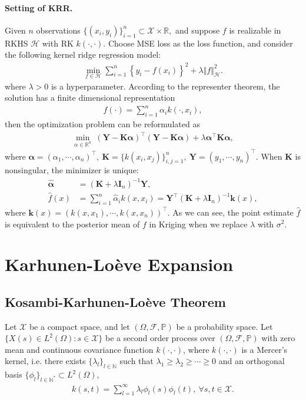 \documentclass{article}
\begin{document}
\paragraph{Setting of KRR.} Given $n$ observations $\lbrace(x_i,y_i)\rbrace_{i=1}^n\subset\mathcal{X}\times\mathbb{R},$ and suppose $f$ is realizable in RKHS $\mathcal{H}$ with RK $k(\cdot,\cdot).$ Choose MSE loss as the loss function, and consider the following kernel ridge regression model:
\begin{align*}
	\min_{f\in\mathcal{H}} \sum_{i=1}^n \left\lbrace y_i - f(x_i)\right\rbrace^2 + \lambda\Vert f\Vert_\mathcal{H}^2.\tag{6.16}
\end{align*}
where $\lambda>0$ is a hyperparameter. According to the representer theorem, the solution has a finite dimensional representation 
\begin{align*}
	f(\cdot) = \sum_{i=1}^n \alpha_i k(\cdot,x_i),\tag{6.17}
\end{align*}
then the optimization problem can be reformulated as
\begin{align*}
	\min_{\alpha\in\mathbb{R}^n}\ (\mathbf{Y} - \mathbf{K}\pmb{\alpha})^\top(\mathbf{Y} - \mathbf{K}\pmb{\alpha}) + \lambda\pmb{\alpha}^\top\mathbf{K}\pmb{\alpha},\tag{6.18}
\end{align*}
where $\pmb{\alpha}=(\alpha_1,\cdots,\alpha_n)^\top,\ \mathbf{K}=\lbrace k(x_i,x_j)\rbrace_{i,j=1}^n,\ \mathbf{Y}=(y_1,\cdots,y_n)^\top.$ When $\mathbf{K}$ is nonsingular, the minimizer is unique:
\begin{align*}
	\hat{\pmb{\alpha}} &= (\mathbf{K}+\lambda\mathbf{I}_n)^{-1}\mathbf{Y},\tag{6.19}\\
	\hat{f}(x) &= \sum_{i=1}^n\hat{\alpha}_ik(x,x_i) = \mathbf{Y}^\top(\mathbf{K}+\lambda\mathbf{I}_n)^{-1}\mathbf{k}(x),\tag{6.20}
\end{align*}
where $\mathbf{k}(x)=\left(k(x,x_1),\cdots,k(x,x_n)\right)^\top.$ As we can see, the point estimate $\hat{f}$ is equivalent to the posterior mean of $f$ in Kriging when we replace $\lambda$ with $\sigma^2.$

\newpage

\section{Karhunen-Loève Expansion}
\subsection{Kosambi-Karhunen-Loève Theorem}
Let $\mathcal{X}$ be a compact space, and let $(\Omega,\mathcal{F},\mathbb{P})$ be a probability space. Let $\lbrace X(s) \in L^2(\Omega): s\in\mathcal{X} \rbrace$ be a second order process over $(\Omega,\mathcal{F},\mathbb{P})$ with zero mean and continuous covariance function $k(\cdot,\cdot)$, where $k(\cdot,\cdot)$ is a Mercer's kernel, i.e. there exists $\lbrace \lambda_ l\rbrace_ {l\in\mathbb{N}}$ such that $\lambda_1\geq\lambda_2\geq\cdots\geq 0$ and an orthogonal basis $\lbrace \phi_l\rbrace_{l\in\mathbb{N}^*}\subset L^2(\Omega),$
\begin{align*}
	k(s,t) = \sum_{l=1}^\infty \lambda_l\phi_l(s)\phi_l(t),\ \forall s,t\in\mathcal{X}.\tag{7.1}
\end{align*}
\end{document}

